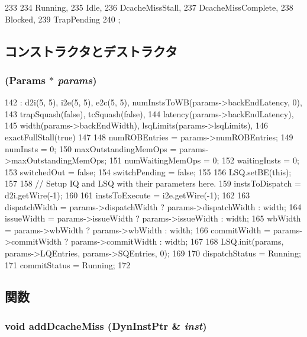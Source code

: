 \begin{DoxyCode}
233                 {
234         Running,
235         Idle,
236         DcacheMissStall,
237         DcacheMissComplete,
238         Blocked,
239         TrapPending
240     };
\end{DoxyCode}


\subsection{コンストラクタとデストラクタ}
\hypertarget{classLWBackEnd_a547c62cea335ccc135b28bf60afc1a65}{
\subsubsection[{LWBackEnd}]{ ({\bf Params} $\ast$ {\em params})}}
\label{classLWBackEnd_a547c62cea335ccc135b28bf60afc1a65}



\begin{DoxyCode}
142     : d2i(5, 5), i2e(5, 5), e2c(5, 5), numInstsToWB(params->backEndLatency, 0),
143       trapSquash(false), tcSquash(false),
144       latency(params->backEndLatency),
145       width(params->backEndWidth), lsqLimits(params->lsqLimits),
146       exactFullStall(true)
147 {
148     numROBEntries = params->numROBEntries;
149     numInsts = 0;
150     maxOutstandingMemOps = params->maxOutstandingMemOps;
151     numWaitingMemOps = 0;
152     waitingInsts = 0;
153     switchedOut = false;
154     switchPending = false;
155 
156     LSQ.setBE(this);
157 
158     // Setup IQ and LSQ with their parameters here.
159     instsToDispatch = d2i.getWire(-1);
160 
161     instsToExecute = i2e.getWire(-1);
162 
163     dispatchWidth = params->dispatchWidth ? params->dispatchWidth : width;
164     issueWidth = params->issueWidth ? params->issueWidth : width;
165     wbWidth = params->wbWidth ? params->wbWidth : width;
166     commitWidth = params->commitWidth ? params->commitWidth : width;
167 
168     LSQ.init(params, params->LQEntries, params->SQEntries, 0);
169 
170     dispatchStatus = Running;
171     commitStatus = Running;
172 }
\end{DoxyCode}


\subsection{関数}
\hypertarget{classLWBackEnd_a1a46c3adb06eeecca716b3cffb054d84}{
\subsubsection[{addDcacheMiss}]{\setlength{\rightskip}{0pt plus 5cm}void addDcacheMiss ({\bf DynInstPtr} \& {\em inst})}}
\label{classLWBackEnd_a1a46c3adb06eeecca716b3cffb054d84}



